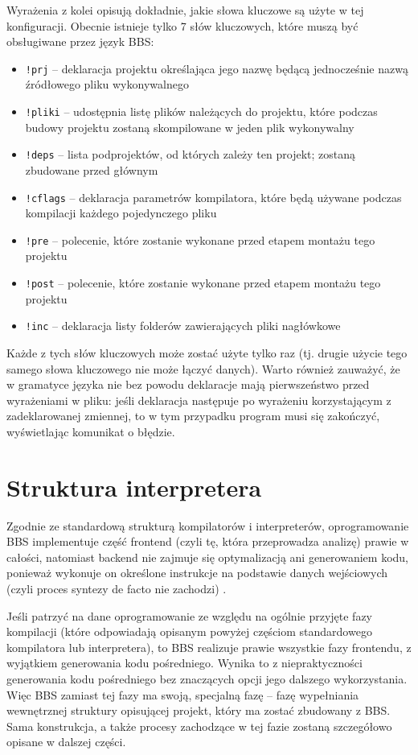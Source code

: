 Wyrażenia z kolei opisują dokładnie, jakie słowa kluczowe są użyte w tej konfiguracji. Obecnie istnieje tylko 7 słów kluczowych, które muszą być obsługiwane przez język BBS:
\begin{itemize}
    \item \texttt{!prj} -- deklaracja projektu określająca jego nazwę będącą jednocześnie nazwą źródłowego pliku wykonywalnego
    \item \texttt{!pliki} -- udostępnia listę plików należących do projektu, które podczas budowy projektu zostaną skompilowane w jeden plik wykonywalny
    \item \texttt{!deps} -- lista podprojektów, od których zależy ten projekt; zostaną zbudowane przed głównym
    \item \texttt{!cflags} -- deklaracja parametrów kompilatora, które będą używane podczas kompilacji każdego pojedynczego pliku
    \item \texttt{!pre} -- polecenie, które zostanie wykonane przed etapem montażu tego projektu
    \item \texttt{!post} -- polecenie, które zostanie wykonane przed etapem montażu tego projektu
    \item \texttt{!inc} -- deklaracja listy folderów zawierających pliki nagłówkowe
\end{itemize}

Każde z tych słów kluczowych może zostać użyte tylko raz (tj. drugie użycie tego samego słowa kluczowego nie może łączyć danych). Warto również zauważyć, że w gramatyce języka nie bez powodu deklaracje mają pierwszeństwo przed wyrażeniami w pliku: jeśli deklaracja następuje po wyrażeniu korzystającym z zadeklarowanej zmiennej, to w tym przypadku program musi się zakończyć, wyświetlając komunikat o błędzie.

\section{Struktura interpretera}
Zgodnie ze standardową strukturą kompilatorów i interpreterów, oprogramowanie BBS implementuje część frontend (czyli tę, która przeprowadza analizę) prawie w całości, natomiast backend nie zajmuje się optymalizacją ani generowaniem kodu, ponieważ wykonuje on określone instrukcje na podstawie danych wejściowych (czyli proces syntezy de facto nie zachodzi) \cite{compilers}.

Jeśli patrzyć na dane oprogramowanie ze względu na ogólnie przyjęte fazy kompilacji (które odpowiadają opisanym powyżej częściom standardowego kompilatora lub interpretera), to BBS realizuje prawie wszystkie fazy frontendu, z wyjątkiem generowania kodu pośredniego. Wynika to z niepraktyczności generowania kodu pośredniego bez znaczących opcji jego dalszego wykorzystania. Więc BBS zamiast tej fazy ma swoją, specjalną fazę -- fazę wypełniania wewnętrznej struktury opisującej projekt, który ma zostać zbudowany z BBS. Sama konstrukcja, a także procesy zachodzące w tej fazie zostaną szczegółowo opisane w dalszej części.

